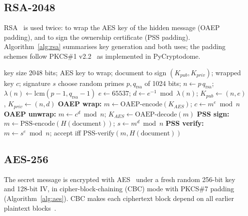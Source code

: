 \documentclass[11pt,a4paper]{article}
\begin{document}
\subsection{RSA-2048}

RSA~\cite{rfc8017} is used twice: to wrap the AES key of the hidden message (OAEP padding), and to sign the ownership certificate (PSS padding). Algorithm~\ref{alg:rsa} summarises key generation and both uses; the padding schemes follow PKCS\#1 v2.2~\cite{rfc8017} as implemented in PyCryptodome.

\begin{algorithm}[!htbp]
\caption{RSA-2048: key generation, OAEP key wrapping and PSS signatures}\label{alg:rsa}
\begin{algorithmic}[1]
\Require key size 2048 bits; AES key to wrap; document to sign
\Ensure $(K_{pub},K_{priv})$; wrapped key $c$; signature $s$
\State choose random primes $p, q_{\mathrm{rsa}}$ of 1024 bits; $n\gets p\,q_{\mathrm{rsa}}$; $\lambda(n)\gets\mathrm{lcm}(p-1,q_{\mathrm{rsa}}-1)$
\State $e\gets65537$; \quad $d\gets e^{-1}\bmod\lambda(n)$; \quad $K_{pub}\gets(n,e)$, $K_{priv}\gets(n,d)$
\State \textbf{OAEP wrap:} $m\gets\mathrm{OAEP\text{-}encode}(K_{AES})$; \quad $c\gets m^{e}\bmod n$ 
\State \textbf{OAEP unwrap:} $m\gets c^{d}\bmod n$; \quad $K_{AES}\gets\mathrm{OAEP\text{-}decode}(m)$
\State \textbf{PSS sign:} $m\gets\mathrm{PSS\text{-}encode}(H(\text{document}))$; \quad $s\gets m^{d}\bmod n$
\State \textbf{PSS verify:} $m\gets s^{e}\bmod n$; \quad accept iff $\mathrm{PSS\text{-}verify}(m, H(\text{document}))$
\end{algorithmic}
\end{algorithm}

\subsection{AES-256}

The secret message is encrypted with AES~\cite{fips197} under a fresh random 256-bit key and 128-bit IV, in cipher-block-chaining (CBC) mode with PKCS\#7 padding (Algorithm~\ref{alg:aes}). %
CBC makes each ciphertext block depend on all earlier plaintext blocks~\cite{TODO}.
\end{document}
